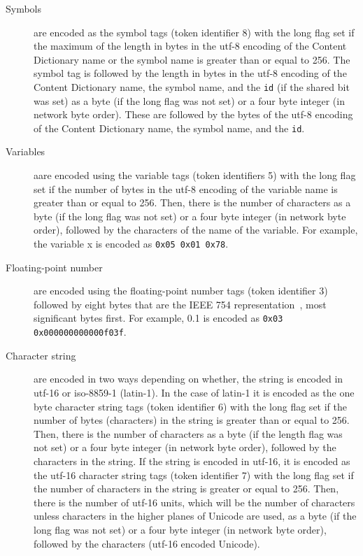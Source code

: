 \documentclass{report}
\def\acronym#1{\textsf{#1}}
\begin{document}
\begin{description}
\item[Symbols] are encoded as the symbol tags (token identifier 8) with the long flag set
  if the maximum of the length in bytes in the \acronym{utf-8} encoding of the Content
  Dictionary name or the symbol name is greater than or equal to 256. The symbol tag is
  followed by the length in bytes in the \acronym{utf-8} encoding of the Content
  Dictionary name, the symbol name, and the \lstinline|id| (if the shared bit was set) as
  a byte (if the long flag was not set) or a four byte integer (in network byte
  order). These are followed by the bytes of the \acronym{utf-8} encoding of the Content
  Dictionary name, the symbol name, and the \lstinline|id|.
\item[Variables] aare encoded using the variable tags (token identifiers 5) with the long
  flag set if the number of bytes in the \acronym{utf-8} encoding of the variable name is
  greater than or equal to 256.  Then, there is the number of characters as a byte (if the
  long flag was not set) or a four byte integer (in network byte order), followed by the
  characters of the name of the variable. For example, the variable x is encoded as
  \lstinline|0x05 0x01 0x78|.
  \item[Floating-point number] are encoded using the floating-point number tags (token
    identifier 3) followed by eight bytes that are the IEEE 754
    representation~\cite{ieee754_85}, most significant bytes first. For example, 0.1 is
    encoded as \lstinline|0x03 0x000000000000f03f|.
  \item[Character string] are encoded in two ways depending on whether, the string is
    encoded in \acronym{utf-16} or \acronym{iso-8859-1} (\acronym{latin-1}).  In the case
    of \acronym{latin-1} it is encoded as the one byte character string tags (token
    identifier 6) with the long flag set if the number of bytes (characters) in the string
    is greater than or equal to 256.  Then, there is the number of characters as a byte
    (if the length flag was not set) or a four byte integer (in network byte order),
    followed by the characters in the string. If the string is encoded in
    \acronym{utf-16}, it is encoded as the \acronym{utf-16} character string tags (token
    identifier 7) with the long flag set if the number of characters in the string is
    greater or equal to 256. Then, there is the number of \acronym{utf-16} units, which
    will be the number of characters unless characters in the higher planes of Unicode are
    used, as a byte (if the long flag was not set) or a four byte integer (in network byte
    order), followed by the characters (\acronym{utf-16} encoded Unicode).


\end{description}
\end{document}
